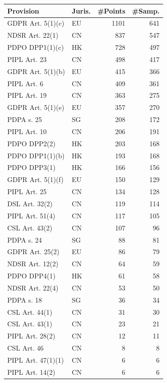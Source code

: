 \begin{table}[t]
\centering
\scriptsize
\setlength{\tabcolsep}{4pt}
\renewcommand{\arraystretch}{1.05}
\begin{tabularx}{\columnwidth}{X l r r}
\toprule
\textbf{Provision} & \textbf{Juris.} & \textbf{\#Points} & \textbf{\#Samp.} \\
\midrule
GDPR Art. 5(1)(c) & EU & 1101 & 641 \\
NDSR Art. 22(1) & CN & 837 & 547 \\
PDPO DPP1(1)(c) & HK & 728 & 497 \\
PIPL Art. 23 & CN & 498 & 417 \\
GDPR Art. 5(1)(b) & EU & 415 & 366 \\
PIPL Art. 6 & CN & 409 & 361 \\
PIPL Art. 19 & CN & 363 & 275 \\
GDPR Art. 5(1)(e) & EU & 357 & 270 \\
PDPA s. 25 & SG & 208 & 172 \\
PIPL Art. 10 & CN & 206 & 191 \\
PDPO DPP2(2) & HK & 203 & 168 \\
PDPO DPP1(1)(b) & HK & 193 & 168 \\
PDPO DPP3(1) & HK & 166 & 156 \\
GDPR Art. 5(1)(f) & EU & 150 & 129 \\
PIPL Art. 25 & CN & 134 & 128 \\
DSL Art. 32(2) & CN & 119 & 114 \\
PIPL Art. 51(4) & CN & 117 & 105 \\
CSL Art. 43(2) & CN & 107 & 96 \\
PDPA s. 24 & SG & 88 & 81 \\
GDPR Art. 25(2) & EU & 86 & 79 \\
NDSR Art. 12(2) & CN & 64 & 59 \\
PDPO DPP4(1) & HK & 61 & 58 \\
NDSR Art. 22(4) & CN & 53 & 50 \\
PDPA s. 18 & SG & 36 & 34 \\
CSL Art. 44(1) & CN & 31 & 30 \\
CSL Art. 43(1) & CN & 23 & 21 \\
PIPL Art. 28(2) & CN & 12 & 11 \\
CSL Art. 46 & CN & 8 & 8 \\
PIPL Art. 47(1)(1) & CN & 6 & 6 \\
PIPL Art. 14(2) & CN & 6 & 6 \\

\end{tabularx}
\end{table}
